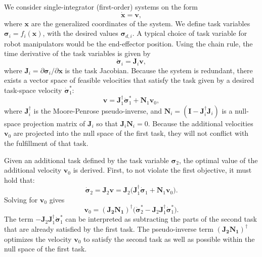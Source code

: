 We consider single-integrator (first-order) systems on the form
\begin{equation}
    \dot{\mathbf{x}} = \mathbf{v},
\end{equation}
where $\mathbf{x}$ are the generalized coordinates of the system. We define task variables $\bm{\sigma}_i = f_i(\mathbf{x})$, with the desired values $\bm{\sigma}_{d, i}$. A typical choice of task variable for robot manipulators would be the end-effector position. Using the chain rule, the time derivative of the task variables is given by
\begin{equation}
    \dot{\bm{\sigma}}_i = \mathbf{J}_i \mathbf{v},
\end{equation}
where $\mathbf{J}_i = \partial \bm{\sigma}_i /\partial \mathbf{x}$ is the task Jacobian. Because the system is redundant, there exists a vector space of feasible velocities that satisfy the task given by a desired task-space velocity $\dot{\bm{\sigma}}_1^*$:
\begin{equation}
    \mathbf{v} = \mathbf{J}_1^\dagger \dot{\bm{\sigma}}_1^* + \mathbf{N}_1 \mathbf{v}_0,\label{eq:null_space_projection_method}
\end{equation}
where $\mathbf{J}_i^\dagger$ is the Moore-Penrose pseudo-inverse, and $\mathbf{N}_i = (\mathbf{I} - \mathbf{J}_i^\dagger \mathbf{J}_i)$ is a null-space projection matrix of $\mathbf{J}_i$ so that $\mathbf{J}_i \mathbf{N}_i = 0$. Because the additional velocities $\mathbf{v}_0$ are projected into the null space of the first task, they will not conflict with the fulfillment of that task.

Given an additional task defined by the task variable $\bm{\sigma}_2$, the optimal value of the additional velocity $\mathbf{v}_0$ is derived. First, to not violate the first objective, it must hold that:
\begin{equation}
    \dot{\bm{\sigma}}_2 = \mathbf{J}_2 \mathbf{v} = \mathbf{J}_2 \bigl( \mathbf{J}_1^\dagger \dot{\bm{\sigma}}_1 + \mathbf{N}_1 \mathbf{v}_0 \bigr).
\end{equation}
Solving for $\mathbf{v}_0$ gives
\begin{equation}\label{eq:null-space-velocity}
    \mathbf{v}_0 = (\mathbf{J_2} \mathbf{N_1})^\dagger\bigl(\dot{\bm{\sigma}}_2^* - \mathbf{J}_2 \mathbf{J}_1^\dagger \dot{\bm{\sigma}}_1^*\bigr).
\end{equation}
The term $- \mathbf{J}_2 \mathbf{J}_1^\dagger \dot{\bm{\sigma}}_1^*$ can be interpreted as subtracting the parts of the second task that are already satisfied by the first task. The pseudo-inverse term $(\mathbf{J_2} \mathbf{N_1})^\dagger$ optimizes the velocity $\mathbf{v}_0$ to satisfy the second task as well as possible within the null space of the first task.

